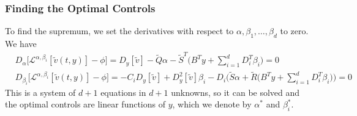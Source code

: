 \subsubsection{Finding the Optimal Controls}
To find the supremum, we set the derivatives with respect to $\alpha, \beta_1, \dots, \beta_d$ to zero. We have
\begin{align}
    &D_\alpha \big[\mathcal{L}^{\alpha, \beta_i}[\tilde{v}(t,y)] - \phi\big] = D_y[\tilde{v}] - \tilde{Q}\alpha - \tilde{S}^T \bigg(B^T y + \sum_{i=1}^d D_i^T \beta_i\bigg) = 0 \label{eq: dual_sys1}\\
    &D_{\beta_i}\big[\mathcal{L}^{\alpha, \beta_i}[\tilde{v}(t,y)] - \phi\big] = - C_i D_y[\tilde{v}] + D_y^2[\tilde{v}] \beta_i
    - D_i \bigg(\tilde{S}\alpha + \tilde{R}\bigg(B^T y + \sum_{i=1}^d D_i^T \beta_i\bigg)\bigg) = 0 \label{eq: dual_sys2}
\end{align}
This is a system of $d+1$ equations in $d+1$ unknowns, so it can be solved and the optimal controls are linear functions of $y$,  which we denote by $\alpha^\ast$ and $\beta_i^\ast$.
